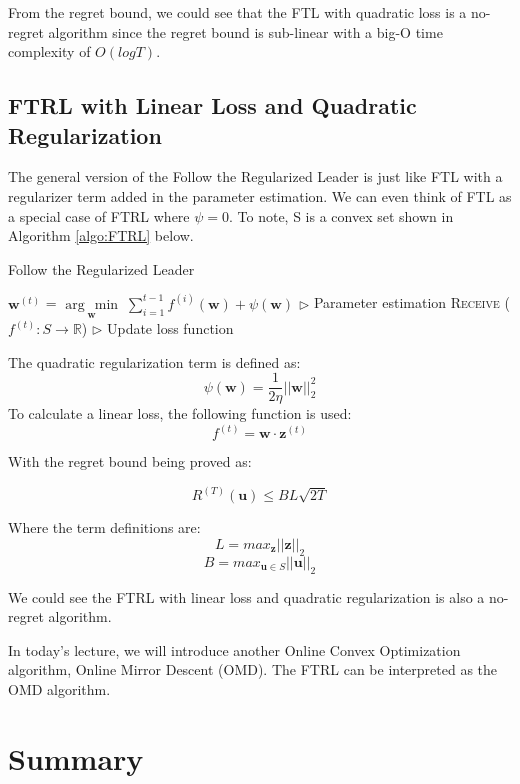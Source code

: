 \documentclass[11pt]{article}
\newcommand{\argmin}[1]{\underset{#1}{\operatorname{arg}\,\operatorname{min}}\;}
\begin{document}
From the regret bound, we could see that the FTL with quadratic loss is a no-regret algorithm since the regret bound is sub-linear with a big-O time complexity of $O(logT)$.

\subsection{FTRL with Linear Loss and Quadratic Regularization}
The general version of the Follow the Regularized Leader is just like FTL with a regularizer term added in the parameter estimation. We can even think of FTL as a special case of FTRL where $\psi = 0$. To note, S is a convex set shown in Algorithm \ref{algo:FTRL} below.

\begin{algorithm}[H]
\caption{Follow the Regularized Leader}
\label{algo:FTRL}
\begin{algorithmic}[1]
    \STATE $\bm{w}^{(t)}$ = $\argmin{\bm{w}} \sum^{t-1}_{i=1} f^{(i)} (\bm{w}) + \psi (\bm{w})$ \hfill $\triangleright$ Parameter estimation
    \STATE \textsc{Receive} ($f^{(t)} : S \rightarrow \mathbb{R}$) \hfill $\triangleright$ Update loss function
\ENDFOR
\end{algorithmic}
\end{algorithm}


The quadratic regularization term is defined as:
\[
\psi(\bm{w}) = \frac{1}{2\eta}||\bm{w}||^2_2
\]
To calculate a linear loss, the following function is used:
\[
f^{(t)} = \bm{w}\cdot\bm{z}^{(t)}
\]

With the regret bound being proved as:

\begin{equation*}
R^{(T)}(\bm{u}) \leq BL\sqrt{2T}
\end{equation*}

Where the term definitions are:
\begin{equation*}
L = max_{\bm{z}}||\bm{z}||_2
\end{equation*}
\begin{equation*}
B = max_{\bm{u} \in S}||\bm{u}||_2
\end{equation*}

We could see the FTRL with linear loss and quadratic regularization is also a no-regret algorithm.

In today's lecture, we will introduce another Online Convex Optimization algorithm, Online Mirror Descent (OMD). The FTRL can be interpreted as the OMD algorithm.

\section{Summary}
\end{document}
